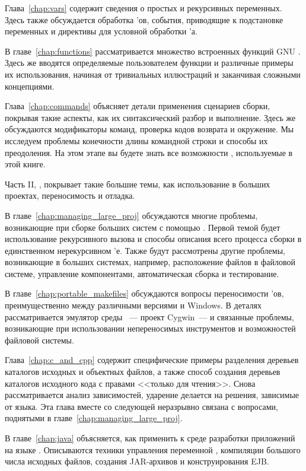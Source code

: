 Глава~\ref{chap:vars} содержит сведения о простых и рекурсивных
переменных. Здесь также обсуждается обработка \Makefile{}'ов, события,
приводящие к подстановке переменных и директивы для условной обработки
\Makefile{}'а.

В главе~\ref{chap:functions} рассматривается множество встроенных
функций GNU \GNUmake{}. Здесь же вводятся определяемые пользователем
функции и различные примеры их использования, начиная от тривиальных
иллюстраций и заканчивая сложными концепциями.

Глава~\ref{chap:commands} объясняет детали применения сценариев
сборки, покрывая такие аспекты, как их синтаксический разбор и
выполнение. Здесь же обсуждаются модификаторы команд, проверка кодов
возврата и окружение. Мы исследуем проблемы конечности длины командной
строки и способы их преодоления. На этом этапе вы будете знать все
возможности \GNUmake{}, используемые в этой книге.

Часть II, \textit{}, покрывает такие
большие темы, как использование \GNUmake{} в больших проектах,
переносимость и отладка.

В главе~\ref{chap:managing_large_proj} обсуждаются многие проблемы,
возникающие при сборке больших систем с помощью \GNUmake{}. Первой
темой будет использование рекурсивного вызова \GNUmake{} и способы
описания всего процесса сборки в единственном нерекурсивном
\Makefile'е. Также будут рассмотрены другие проблемы, возникающие в
больших системах, например, расположение файлов в файловой системе,
управление компонентами, автоматическая сборка и тестирование.

В главе~\ref{chap:portable_makefiles} обсуждаются вопросы
переносимости \Makefile'ов, преимущественно между различными версиями
\UNIX{} и Windows. В деталях рассматривается эмулятор среды
\UNIX{}~--- проект Cygwin~--- и связанные проблемы, возникающие при
использовании непереносимых инструментов и возможностей файловой
системы.

Глава~\ref{chap:c_and_cpp} содержит специфические примеры разделения
деревьев каталогов исходных и объектных файлов, а также способ
создания деревьев каталогов исходного кода с правами <<только для
чтения>>. Снова рассматривается анализ зависимостей, ударение делается
на решения, зависимые от языка. Эта глава вместе со следующей
неразрывно связана с вопросами, поднятыми в
главе~\ref{chap:managing_large_proj}.

В главе~\ref{chap:java} объясняется, как применить \GNUmake{} к среде
разработки приложений на языке \Java{}. Описываются техники управления
переменной , компиляции большого числа исходных
файлов, создания JAR-архивов и конструирования EJB.

